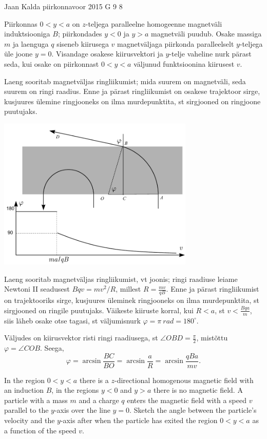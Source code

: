 {Jaan Kalda} %
{piirkonnavoor} %
{2015} %
{G 9} %
{8} %
{
\ifStatement
Piirkonnas $0<y<a$ on $z$-teljega paralleelne homogeenne magnetväli induktsiooniga $B$; piirkondades $y<0$ ja $y>a$ magnetväli puudub. 
Osake massiga $m$ ja laenguga $q$ siseneb kiirusega $v$ magnetväljaga piirkonda paralleelselt $y$-teljega üle joone $y=0$. Visandage osakese kiirusvektori ja $y$-telje vaheline nurk pärast seda, kui osake on piirkonnast $0<y<a$ väljunud funktsioonina kiirusest $v$.
\fi


\ifHint
Laeng sooritab magnetväljas ringliikumist; mida suurem on magnetväli, seda suurem on ringi raadius. Enne ja pärast ringliikumist on osakese trajektoor sirge, kusjuures ülemine ringjooneks on ilma murdepunktita, st sirgjooned on ringjoone puutujaks.
\fi


\ifSolution
\begin{center}
\includegraphics[width=0.7\textwidth]{2015-v2g-09-magnetvalilah}
\end{center}
Laeng sooritab magnetväljas ringliikumist, vt joonis;
ringi raadiuse leiame Newtoni II seadusest $Bqv=mv^2/R$, millest
$R=\frac{mv}{qB}$. Enne ja pärast ringliikumist on trajektooriks sirge, kusjuures üleminek ringjooneks on ilma murdepunktita, st sirgjooned on ringile puutujaks. Väikeste kiiruste korral, kui $R<a$, st $v<\frac{Bqa}{m}$, siis läheb osake otse tagasi,
st väljumisnurk $\varphi=\pi \SI{}{rad}=180^\circ$.

Väljudes on kiirusvektor risti ringi raadiusega, st $\angle OBD=\frac \pi 2$, mistõttu $\varphi=\angle COB$. Seega,
\[
\varphi=\arcsin \frac{BC}{BO}=\arcsin \frac{a}{R}=\arcsin \frac{qBa}{mv}.
\]
\fi


\ifEngStatement
In the region $0<y<a$ there is a $z$-directional homogenous magnetic field with an induction $B$, in the regions $y<0$ and $y>a$ there is no magnetic field. A particle with a mass $m$ and a charge $q$ enters the magnetic field with a speed $v$ parallel to the $y$-axis over the line $y=0$. Sketch the angle between the particle’s velocity and the $y$-axis after when the particle has exited the region $0<y<a$ as a function of the speed $v$.
\fi


}
